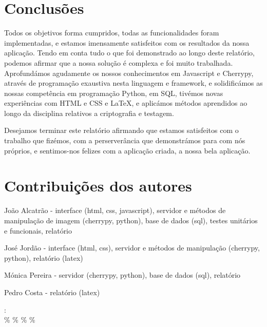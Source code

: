 \documentclass{report}
\begin{document}
    

\chapter{Conclusões}
\label{chap.conclusao}
Todos os objetivos forma cumpridos, todas as funcionalidades foram implementadas, e estamos imensamente satisfeitos com os resultados da nossa aplicação. Tendo em conta tudo o que foi demonstrado ao longo deste relatório, podemos afirmar que a nossa solução é complexa e foi muito trabalhada. Aprofundámos agudamente os nossos conhecimentos em Javascript e Cherrypy, através de programação exaustiva nesta linguagem e framework, e solidificámos as nossas competência em programação Python, em SQL, tivémos novas experiências com HTML e CSS e LaTeX, e aplicámos métodos aprendidos ao longo da disciplina relativos a criptografia e testagem. 

\linebreak
\bigskip

Desejamos terminar este relatório afirmando que estamos satisfeitos com o trabalho que fizémos, com a perserverância que demonstrámos para com nós próprios, e sentimos-nos felizes com a aplicação criada, a nossa bela aplicação.

\chapter*{Contribuições dos autores}
João Alcatrão - interface (html, css, javascript), servidor e métodos de manipulação de imagem (cherrypy, python), base de dados (sql), testes unitários e funcionais, relatório

\linebreak
\bigskip

José Jordão - interface (html, css), servidor e métodos de manipulação (cherrypy, python), relatório (latex)

\linebreak
\bigskip

Mónica Pereira - servidor (cherrypy, python), base de dados (sql), relatório
\linebreak

Pedro Costa - relatório (latex)


\vspace{10pt}


\autores : 
\\

\quad{}\%  \qquad\quad{}\%   \quad\quad\quad{}\%   \quad\quad\quad{}\%\\
\end{document}
